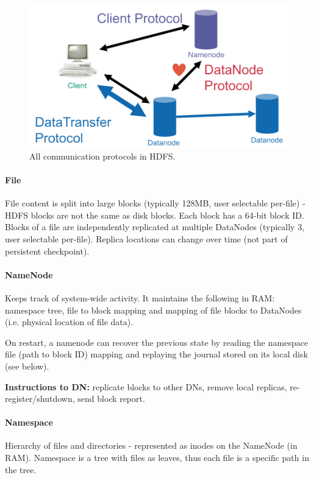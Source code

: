 \begin{figure}[h]
	\centering
	\includegraphics[scale=0.8]{images/2-hdfs_comm.PNG}
	\caption{All communication protocols in HDFS.}
	\label{fig:hdfs_comm}
\end{figure}

\paragraph{File}
File content is split into large blocks (typically 128MB, user selectable per-file) - HDFS blocks are not the same as disk blocks. Each block has a 64-bit block ID. Blocks of a file are independently replicated at multiple DataNodes (typically 3, user selectable per-file). Replica locations can change over time (not part of persistent checkpoint).

\paragraph{NameNode}
Keeps track of system-wide activity. It maintains the following in RAM: namespace tree, file to block mapping and mapping of file blocks to DataNodes (i.e. physical location of file data).

On restart, a namenode can recover the previous state by reading the namespace file (path to block ID) mapping and replaying the journal stored on its local disk (see below).

\textbf{Instructions to DN:} replicate blocks to other DNs, remove local replicas, re-register/shutdown, send block report.

\paragraph{Namespace}
Hierarchy of files and directories - represented as inodes on the NameNode (in RAM). Namespace is a tree with files as leaves, thus each file is a specific path in the tree.

